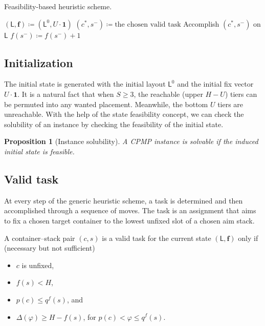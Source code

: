 \documentclass[review,3p,times,12pt,number]{elsarticle}\usepackage{amsmath}\usepackage{amssymb}
\newtheorem{proposition}{Proposition}
\renewcommand{\gets}{\coloneqq}
\newcommand{\setalgo}{\linespread{1}\fontsize{10}{12}\selectfont}
\begin{document}
\begin{algorithm}[htbp]
\caption{Feasibility-based heuristic scheme.}
\label{algo:fbhs}


\setalgo


\Begin
{
  $(\mathsf{L},\boldsymbol{f})\gets (\mathsf{L}^0,U\cdot\boldsymbol{1})$\;
  {
    $(c^*, s^-)\gets \textrm{the chosen valid task}$\;
    Accomplish $( c^*, s^-) $ on $\mathsf{L}$\;
    $f(s^-)\gets f(s^-)+1$\;
  }
}

\end{algorithm}

\subsection{Initialization}

The initial state is generated with the initial layout $\mathsf{L}^0$ and the initial fix vector $U\cdot\boldsymbol{1}$. It is a natural fact that when $S\ge 3$, the reachable (upper $H-U$) tiers can be permuted into any wanted placement. Meanwhile, the bottom $U$ tiers are unreachable. With the help of the state feasibility concept, we can check the solubility of an instance by checking the feasibility of the initial state.

\begin{proposition}[Instance solubility]
A CPMP instance is solvable if the induced initial state is feasible.
\end{proposition}


\subsection{Valid task}
\label{sec:valid}

At every step of the generic heuristic scheme, a {task} is determined and then accomplished through a sequence of moves. The task is an assignment that aims to fix a chosen target container to the lowest unfixed slot of a chosen aim stack.

A container--stack pair $(c,s)$ is a valid task for the current state $( \mathsf{L},\boldsymbol{f})$ only if (necessary but not sufficient)
\begin{itemize}
\item $c$ is unfixed,
\item $f(s)<H$,
\item $p(c)\le q^f(s)$, and
\item $\Delta(\varphi)\ge H-f(s)$, for $p(c)< \varphi\le q^f(s)$.
\end{itemize}
\end{document}
